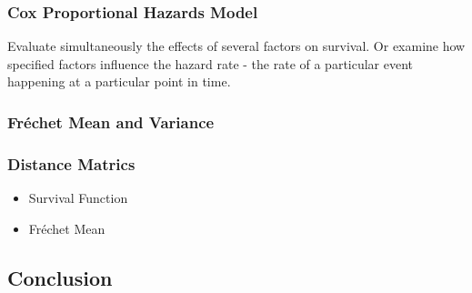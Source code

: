     \subsubsection{Cox Proportional Hazards Model}
         \par
          Evaluate simultaneously the effects of several factors on survival. Or examine how specified factors influence the hazard rate - the rate of a particular event happening at a particular point in time. 
      
    \subsubsection{Fr\'echet Mean and Variance}

    
    \subsubsection{Distance Matrics}
      \begin{itemize}
        \item Survival Function
        \item Fr\'echet Mean
      \end{itemize}
      
     
  \subsection{Conclusion}


